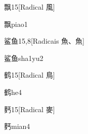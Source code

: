 \begin{entry}{飘}{15}[Radical ⾵]
  \begin{phonetics}{飘}{piao1}
  \end{phonetics}
\end{entry}

\begin{entry}{鲨鱼}{15,8}[Radicais ⿂、⿂]
  \begin{phonetics}{鲨鱼}{sha1yu2}
  \end{phonetics}
\end{entry}

\begin{entry}{鹤}{15}[Radical ⿃]
  \begin{phonetics}{鹤}{he4}
  \end{phonetics}
\end{entry}

\begin{entry}{麫}{15}[Radical ⿆]
  \begin{phonetics}{麫}{mian4}
  \end{phonetics}
\end{entry}



